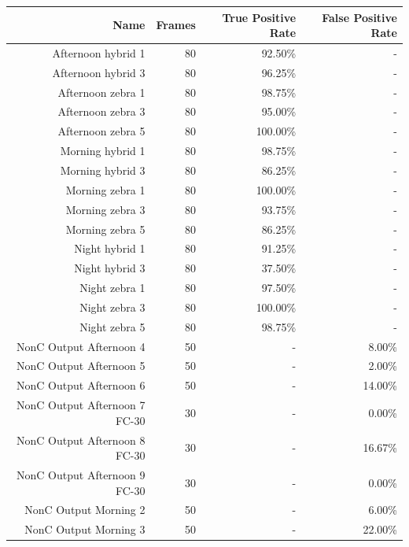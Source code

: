 \documentclass[12pt]{ucthesis}
\begin{document}
    \begin{longtable}{|r|r|r|r|}
    \hline
    Name & Frames & True Positive Rate & False Positive Rate \bigstrut\\
    \hline
    Afternoon hybrid 1 & 80 & 92.50\% & - \bigstrut\\
    \hline
    Afternoon hybrid 3 & 80 & 96.25\% & - \bigstrut\\
    \hline
    Afternoon zebra 1 & 80 & 98.75\% & - \bigstrut\\
    \hline
    Afternoon zebra 3 & 80 & 95.00\% & - \bigstrut\\
    \hline
    Afternoon zebra 5 & 80 & 100.00\% & - \bigstrut\\
    \hline
    Morning hybrid 1 & 80 & 98.75\% & - \bigstrut\\
    \hline
    Morning hybrid 3 & 80 & 86.25\% & - \bigstrut\\
    \hline
    Morning zebra 1 & 80 & 100.00\% & - \bigstrut\\
    \hline
    Morning zebra 3 & 80 & 93.75\% & - \bigstrut\\
    \hline
    Morning zebra 5 & 80 & 86.25\% & - \bigstrut\\
    \hline
    Night hybrid 1 & 80 & 91.25\% & - \bigstrut\\
    \hline
    Night hybrid 3 & 80 & 37.50\% & - \bigstrut\\
    \hline
    Night zebra 1 & 80 & 97.50\% & - \bigstrut\\
    \hline
    Night zebra 3 & 80 & 100.00\% & - \bigstrut\\
    \hline
    Night zebra 5 & 80 & 98.75\% & - \bigstrut\\
    \hline
    NonC Output Afternoon 4 & 50 & -  & 8.00\% \bigstrut\\
    \hline
    NonC Output Afternoon 5 & 50 & -  & 2.00\% \bigstrut\\
    \hline
    NonC Output Afternoon 6 & 50 & -  & 14.00\% \bigstrut\\
    \hline
    NonC Output Afternoon 7 FC-30 & 30 & -  & 0.00\% \bigstrut\\
    \hline
    NonC Output Afternoon 8 FC-30 & 30 & -  & 16.67\% \bigstrut\\
    \hline
    NonC Output Afternoon 9 FC-30 & 30 & -  & 0.00\% \bigstrut\\
    \hline
    NonC Output Morning 2 & 50 & -  & 6.00\% \bigstrut\\
    \hline
    NonC Output Morning 3 & 50 & -  & 22.00\% \bigstrut\\

\end{longtable}
\end{document}
